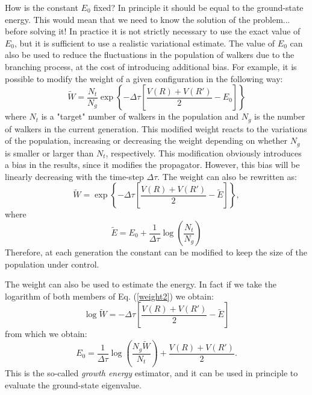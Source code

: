How is the constant $E_0$ fixed? In principle it should be equal to the ground-state energy. This would mean that we need to know the solution of the problem... before solving it! In practice it is not strictly necessary to use the exact value of $E_0$, but it is sufficient to use a realistic variational estimate. The value of $E_0$ can also be used to reduce the fluctuations in the population of walkers due to the branching process, at the cost of introducing additional bias.
For example, it is possible to modify the weight of a given configuration in the following way:
\begin{equation}
\tilde{W}=\frac{N_{t}}{N_g}\exp\left\{ -\Delta\tau\left[\frac{V(R)+V(R')}{2}-E_0\right]\right\}
\end{equation}
where $N_t$ is a "target" number of walkers in the population and $N_g$ is the number of walkers in the current generation. This modified weight reacts to the variations of the population, increasing or decreasing the weight depending on whether $N_g$ is smaller or larger than $N_t$, respectively.
This modification obviously introduces a bias in the results, since it modifies the propagator. However, this bias will be linearly decreasing with the time-step $\Delta\tau$. The weight can  also be rewritten as:
\begin{equation}
\tilde{W}=\exp\left\{ -\Delta\tau\left[\frac{V(R)+V(R')}{2}-\tilde{E}\right]\right\},\label{weight2}
\end{equation}
where
\begin{equation}
\tilde{E}=E_0+\frac{1}{\Delta\tau}\log\left(\frac{N_t}{N_g}\right)
\end{equation}
Therefore, at each generation the constant can be modified to keep the size of the population under control. 

The weight can also be used to estimate the energy. In fact if we take the logarithm of both members of Eq. (\ref{weight2}) we obtain:
\begin{equation}
\log{\tilde{W}}=-\Delta\tau\left[\frac{V(R)+V(R')}{2}-\tilde{E}\right]
\end{equation}
from which we obtain:
\begin{equation}
E_0=\frac{1}{\Delta\tau}\log\left(\frac{N_g\tilde{W}}{N_t}\right)+\frac{V(R)+V(R')}{2}.
\end{equation}
This is the so-called {\it growth energy} estimator, and it can be used in principle to evaluate the
ground-state eigenvalue.

